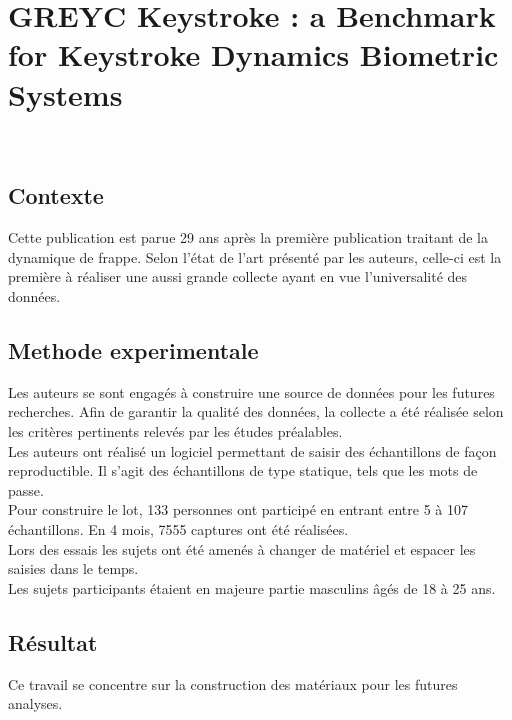 \section{GREYC Keystroke : a Benchmark for Keystroke Dynamics Biometric Systems\cite{giotGREYC}}

\\

\subsection{Contexte}

Cette publication est parue 29 ans après la première publication traitant de la dynamique de frappe. Selon l'état de l'art présenté par les auteurs, celle-ci est la première à réaliser une aussi grande collecte ayant en vue l'universalité des données.

\subsection{Methode experimentale}

Les auteurs se sont engagés à construire une source de données pour les futures recherches. Afin de garantir la qualité des données, la collecte a été réalisée selon les critères pertinents relevés par les études préalables.\\

Les auteurs ont réalisé un logiciel permettant de saisir des échantillons de façon reproductible. Il s'agit des échantillons de type statique, tels que les mots de passe.\\

Pour construire le lot, 133 personnes ont participé en entrant entre 5 à 107 échantillons. En 4 mois, 7555 captures ont été réalisées.\\

Lors des essais les sujets ont été amenés à changer de matériel et espacer les saisies dans le temps.\\

Les sujets participants étaient en majeure partie masculins âgés de 18 à 25 ans.

\subsection{Résultat}

Ce travail se concentre sur la construction des matériaux pour les futures analyses.\\

